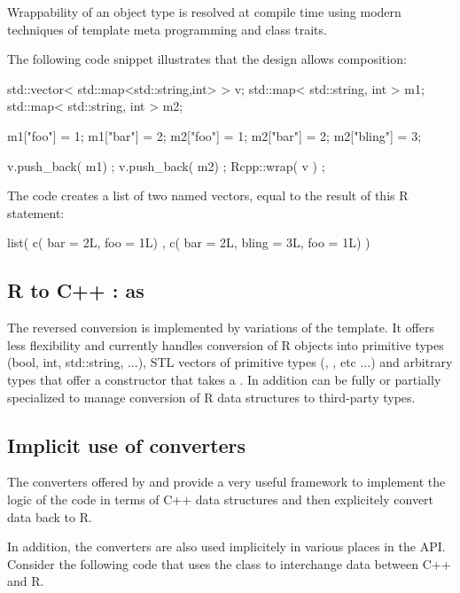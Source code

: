 Wrappability of an object type is resolved at compile time using 
modern techniques of template meta programming and class traits.

The following code snippet illustrates that the design allows
composition:

\begin{example}
std::vector< std::map<std::string,int> > v;
std::map< std::string, int > m1;
std::map< std::string, int > m2;

m1["foo"] = 1; m1["bar"] = 2;
m2["foo"] = 1; m2["bar"] = 2; m2["bling"] = 3;

v.push_back( m1) ;
v.push_back( m2) ;
Rcpp::wrap( v ) ;
\end{example}

The code creates a list of two named vectors, equal to the 
result of this R statement:

\begin{example}
list( c( bar = 2L, foo = 1L) , 
      c( bar = 2L, bling = 3L, foo = 1L) )
\end{example}

\subsection{R to C++ : as}

The reversed conversion is implemented by variations of the 
 template. It offers less flexibility and currently
handles conversion of R objects into primitive types (bool, int, std::string, ...), 
STL vectors of primitive types  (, 
, etc ...) and arbitrary types that offer 
a constructor that takes a . In addition  can 
be fully or partially specialized to manage conversion of R data 
structures to third-party types.

\subsection{Implicit use of converters}

The converters offered by  and  provide a very 
useful framework to implement the logic of the code in terms of C++ 
data structures and then explicitely convert data back to R. 

In addition, the converters are also used implicitely
in various places in the  API. 
Consider the following code that uses the  class to 
interchange data between C++ and R.

